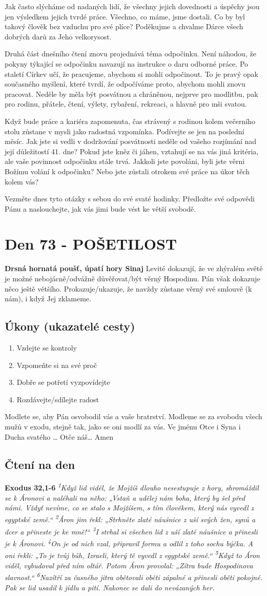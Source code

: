\documentclass[11pt]{article}
\newcommand{\zacatekJedenactyTyden}{
\textbf{Drsná hornatá poušť, úpatí hory Sinaj} \newline 
Levité dokazují, že ve zhýralém světě je možné nebojácně/odvážně důvěřovat/být věrný Hospodinu. Pán však dokazuje něco ještě většího. Prokazuje/ukazuje, že navždy zůstane věrný své smlouvě (k nám), i když Jej zklameme.

\subsection*{Úkony (ukazatelé cesty)}
\begin{enumerate}
  \item Vzdejte se kontroly
  \item Vzpomeňte si na své proč
  \item Dobře se potřetí vyzpovídejte
  \item Rozdávejte/sdílejte radost
\end{enumerate}
Modlete se, aby Pán osvobodil vás a vaše bratrství. \newline
Modleme se za svobodu všech mužů v exodu, stejně tak, jako se oni modlí za vás.\newline
Ve jménu Otce i Syna i Ducha svatého …  Otče náš… Amen
}
\begin{document}
Jak často slýcháme od nadaných lidí, že všechny jejich dovednosti a úspěchy jsou jen výsledkem jejich tvrdé práce.
Všechno, co máme, jsme dostali. Co by byl takový člověk bez vzduchu pro své plíce? Poděkujme a chvalme Dárce
všech dobrých darů za Jeho velkorysost.

Druhá část dnešního čtení znovu projednává téma odpočinku. Není náhodou, že pokyny týkající se odpočinku navazují
na instrukce o daru odborné práce. Po staletí Církev učí, že pracujeme, abychom si mohli odpočinout. To je pravý opak
současného myšlení, které tvrdí, že odpočíváme proto, abychom mohli znovu pracovat. Neděle by měla být posvátnou
a chráněnou, nejprve pro modlitbu, pak pro rodinu, přátele, čtení, výlety, rybaření, rekreaci, a hlavně pro mši svatou.

Když bude práce a kariéra zapomenuta, čas strávený s rodinou kolem večerního stolu zůstane v mysli jako radostná
vzpomínka. Podívejte se jen na poslední měsíc. Jak jste si vedli v dodržování posvátnosti neděle od vašeho rozjímání
nad její důležitostí 41. dne? Pokud jste kněz či jáhen, vztahují se na vás jiná kritéria, ale vaše povinnost odpočinku
stále trvá. Jakkoli jste povoláni, byli jste věrni Božímu volání k odpočinku? Nebo jste zůstali otrokem své práce na
úkor těch kolem vás?

Vezměte dnes tyto otázky s sebou do své svaté hodinky. Předložte své odpovědi Pánu a naslouchejte, jak vás jimi bude
vést ke větší svobodě.



\newpage
\section{Den 73 - POŠETILOST}
\zacatekJedenactyTyden
\subsection*{Čtení na den}
\textbf{Exodus 32,1-6}
\newline
\textit{
\textsuperscript{1}Když lid viděl, že Mojžíš dlouho nesestupuje z hory, shromáždil se k Áronovi a naléhali na něho: „Vstaň a udělej nám boha, který by šel před námi. Vždyť nevíme, co se stalo s Mojžíšem, s tím člověkem, který nás vyvedl z egyptské země.“
\textsuperscript{2}Áron jim řekl: „Strhněte zlaté náušnice z uší svých žen, synů a dcer a přineste je ke mně!“
\textsuperscript{3}I strhal si všechen lid z uší zlaté náušnice a přinesli je k Áronovi.
\textsuperscript{4}On je od nich vzal, připravil formu a odlil z toho sochu býčka. A oni řekli: „To je tvůj bůh, Izraeli, který tě vyvedl z egyptské země.“
\textsuperscript{5}Když to Áron viděl, vybudoval před ním oltář. Potom Áron provolal: „Zítra bude Hospodinova slavnost.“
\textsuperscript{6}Nazítří za časného jitra obětovali oběti zápalné a přinesli oběti pokojné. Pak se lid usadil k jídlu a pití. Nakonec se dali do nevázaných her.
}
\end{document}
